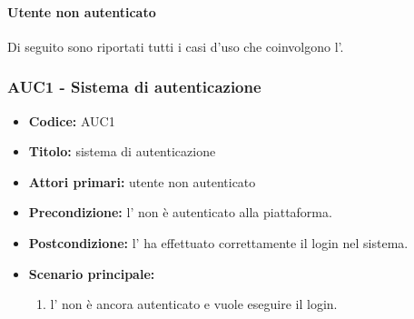 \documentclass[casi-duso]{subfiles}
\begin{document}
\paragraph{Utente non autenticato}
\label{par:utente-non-autenticato}
Di seguito sono riportati tutti i casi d'uso che coinvolgono l'.

\subsubsection{AUC1 - Sistema di autenticazione}
\label{subsub:AUC1}






\begin{itemize}
  \item \textbf{Codice:} AUC1
  \item \textbf{Titolo:} sistema di autenticazione
  \item \textbf{Attori primari:} utente non autenticato
  \item \textbf{Precondizione:} l' non è autenticato alla piattaforma.
  \item \textbf{Postcondizione:} l' ha effettuato correttamente il login nel sistema.
  \item \textbf{Scenario principale:}
  \begin{enumerate}
    \item l' non è ancora autenticato e vuole eseguire il login.
  \end{enumerate}
\end{itemize}
\end{document}
